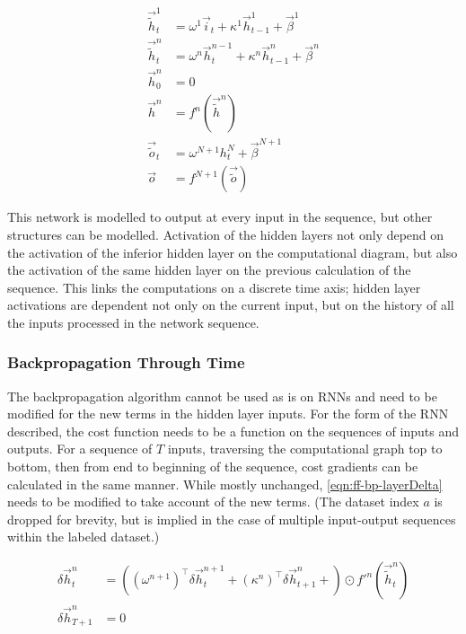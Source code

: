 \documentclass[../dissertation.tex]{subfiles}
\begin{document}
\begin{align}
    \label{eqn:rnn-rules}
    \vec{\tilde{h}}^1_t & = \omega^1 \vec{i}_t          + \kappa^1 \vec{h}^1_{t - 1}    + \vec{\beta}^1 \\
    \vec{\tilde{h}}^n_t & = \omega^n \vec{h}^{n - 1}_t  + \kappa^n \vec{h}^n_{t - 1}    + \vec{\beta}^n \\
    \vec{h}^n_0         & = 0                                                                           \\
    \vec{h}^n           & = f^n \left( \vec{\tilde{h}}^n \right)                                        \\
    \vec{\tilde{o}}_t   & = \omega^{N+1} h^N_t          + \vec{\beta}^{N + 1}                           \\
    \vec{o}             & = f^{N + 1} \left( \vec{\tilde{o}} \right)
\end{align}

This network is modelled to output at every input in the sequence, but other structures can be modelled.
Activation of the hidden layers not only depend on the activation of the inferior hidden layer on the computational diagram, but also the activation of the same hidden layer on the previous calculation of the sequence.
This links the computations on a discrete time axis; hidden layer activations are dependent not only on the current input, but on the history of all the inputs processed in the network sequence.

\subsubsection{Backpropagation Through Time}

The backpropagation algorithm cannot be used as is on RNNs and need to be modified for the new terms in the hidden layer inputs.
For the form of the RNN described, the cost function needs to be a function on the sequences of inputs and outputs.
For a sequence of $T$ inputs, traversing the computational graph top to bottom, then from end to beginning of the sequence, cost gradients can be calculated in the same manner.
While mostly unchanged, \cref{eqn:ff-bp-layerDelta} needs to be modified to take account of the new terms.
(The dataset index $a$ is dropped for brevity, but is implied in the case of multiple input-output sequences within the labeled dataset.)

\begin{align}
    \label{eqn:rec-bp-layerDelta}
    \delta \vec{h}^n_t & = \left(
        \left( \omega^{n + 1} \right)^\intercal
        \delta \vec{h}^{n + 1}_t + 
        \left( \kappa^n \right)^\intercal
        \delta \vec{h}^n_{t + 1} + 
        \right) \odot
        f'^n \left( \vec{\tilde{h}}^n_t \right) \\
    \delta \vec{h}^n_{T + 1} & = 0
\end{align}
\end{document}
